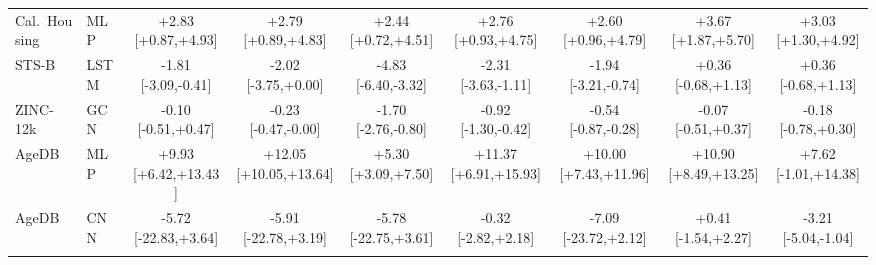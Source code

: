 \begin{table}[t]
\begin{center}
\begin{tabular}{llccccccc}
Cal.\ Housing & MLP & +2.83 [+0.87,+4.93] & +2.79 [+0.89,+4.83] & +2.44 [+0.72,+4.51] & +2.76 [+0.93,+4.75] & +2.60 [+0.96,+4.79] & +3.67 [+1.87,+5.70] & +3.03 [+1.30,+4.92] \\
STS-B & LSTM & -1.81 [-3.09,-0.41] & -2.02 [-3.75,+0.00] & -4.83 [-6.40,-3.32] & -2.31 [-3.63,-1.11] & -1.94 [-3.21,-0.74] & +0.36 [-0.68,+1.13] & +0.36 [-0.68,+1.13] \\
ZINC-12k & GCN & -0.10 [-0.51,+0.47] & -0.23 [-0.47,-0.00] & -1.70 [-2.76,-0.80] & -0.92 [-1.30,-0.42] & -0.54 [-0.87,-0.28] & -0.07 [-0.51,+0.37] & -0.18 [-0.78,+0.30] \\
AgeDB & MLP & +9.93 [+6.42,+13.43] & +12.05 [+10.05,+13.64] & +5.30 [+3.09,+7.50] & +11.37 [+6.91,+15.93] & +10.00 [+7.43,+11.96] & +10.90 [+8.49,+13.25] & +7.62 [-1.01,+14.38] \\
AgeDB & CNN & -5.72 [-22.83,+3.64] & -5.91 [-22.78,+3.19] & -5.78 [-22.75,+3.61] & -0.32 [-2.82,+2.18] & -7.09 [-23.72,+2.12] & +0.41 [-1.54,+2.27] & -3.21 [-5.04,-1.04] \\
\\[-1.5ex]
\end{tabular}\end{center}\end{table}
